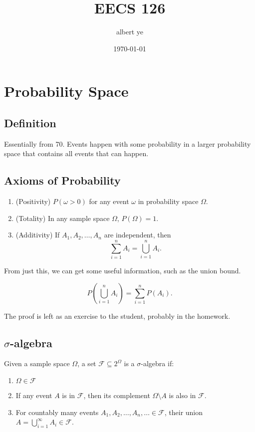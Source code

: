 \documentclass{article}
\title{EECS 126}
\author{albert ye}
\date{\today}
\begin{document}
\maketitle
\section{Probability Space}
\subsection{Definition}
Essentially from 70. Events happen with some probability in a larger probability space that contains all events that can happen.
\subsection{Axioms of Probability}
\begin{proposition}[Axioms]
	\begin{enumerate}
		\item (Positivity) $P(\omega > 0)$ for any event $\omega$ in probability space $\Omega$. 
		\item (Totality) In any sample space $\Omega$, $P(\Omega) = 1$.
		\item (Additivity) If $A_1, A_2, \ldots, A_n$ are independent, then \[\sum_{i=1}^n A_i = \bigcup_{i = 1}^n A_i.\] 
	\end{enumerate}
\end{proposition}

From just this, we can get some useful information, such as the union bound.
\begin{theorem}
	\[P\left(\bigcup_{i = 1}^n A_i\right) = \sum_{i = 1}^n P(A_i).\]
\end{theorem}

The proof is left as an exercise to the student, probably in the homework.
\subsection{$\sigma$-algebra}
\begin{definition}
	Given a sample space $\Omega$, a set $\mathcal{F} \subseteq 2^{\Omega}$ is a $\sigma$-algebra if:
	\begin{enumerate}
		\item $\Omega \in \mathcal{F}$
		\item If any event $A$ is in $\mathcal{F}$, then its complement $\Omega \setminus A$ is also in $\mathcal{F}$.
		\item For countably many events $A_1, A_2, \ldots, A_n, \ldots \in \mathcal{F}$, their union $A = \bigcup_{i=1}^\infty A_i \in \mathcal{F}$.
	\end{enumerate}
\end{definition}
\end{document}
